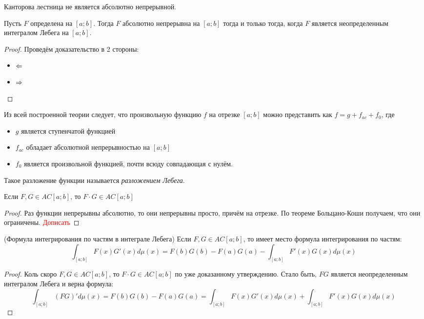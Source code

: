 \begin{corollary}
	Канторова лестница не является абсолютно непрерывной.
\end{corollary}

\begin{theorem}
	Пусть $F$ определена на $[a; b]$. Тогда $F$ абсолютно непрерывна на $[a; b]$ тогда и только тогда, когда $F$ является неопределенным интегралом Лебега на $[a; b]$.
\end{theorem}

\begin{proof}
	Проведём доказательство в 2 стороны:
	\begin{itemize}
		\item $\Leftarrow$
		
		\item $\Rightarrow$
	\end{itemize}
\end{proof}

\begin{note}
	Из всей построенной теории следует, что произвольную функцию $f$ на отрезке $[a; b]$ можно представить как $f = g + f_{ac} + f_0$, где
	\begin{itemize}
		\item $g$ является ступенчатой функцией
		
		\item $f_{ac}$ обладает абсолютной непрерывностью на $[a; b]$
		
		\item $f_0$ является произвольной функцией, почти всюду совпадающая с нулём.
	\end{itemize}
	Такое разложение функции называется \textit{разложением Лебега}.
\end{note}

\begin{proposition}
	Если $F, G \in AC[a; b]$, то $F \cdot G \in AC[a; b]$
\end{proposition}

\begin{proof}
	Раз функции непрерывны абсолютно, то они непрерывны просто, причём на отрезке. По теореме Больцано-Коши получаем, что они ограничены.
	\textcolor{red}{Дописать}
\end{proof}

\begin{corollary} (Формула интегрирования по частям в интеграле Лебега)
	Если $F, G \in AC[a; b]$, то имеет место формула интегрирования по частям:
	\[
		\int_{[a; b]} F(x)G'(x)d\mu(x) = F(b)G(b) - F(a)G(a) - \int_{[a; b]} F'(x)G(x)d\mu(x)
	\]
\end{corollary}

\begin{proof}
	Коль скоро $F, G \in AC[a; b]$, то $F \cdot G \in AC[a; b]$ по уже доказанному утверждению. Стало быть, $FG$ является неопределенным интегралом Лебега и верна формула:
	\[
		\int_{[a; b]} (FG)'d\mu(x) = F(b)G(b) - F(a)G(a) = \int_{[a; b]} F(x)G'(x)d\mu(x) + \int_{[a; b]} F'(x)G(x)d\mu(x)
	\]
\end{proof}

